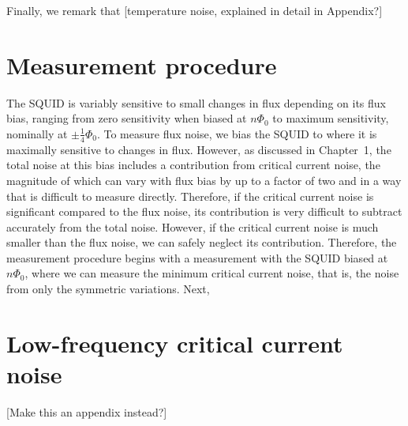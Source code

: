 Finally, we remark that [temperature noise, explained in detail in Appendix?]

\section{Measurement procedure}\label{chap:exp:sec:meas_proc}

The SQUID is variably sensitive to small changes in flux depending on its flux bias, ranging from zero sensitivity when biased at $n\Phi_0$ to maximum sensitivity, nominally at $\pm\tfrac{1}{4}\Phi_0$. To measure flux noise, we bias the SQUID to where it is maximally sensitive to changes in flux. However, as discussed in Chapter~1, the total noise at this bias includes a contribution from critical current noise, the magnitude of which can vary with flux bias by up to a factor of two and in a way that is difficult to measure directly. Therefore, if the critical current noise is significant compared to the flux noise, its contribution is very difficult to subtract accurately from the total noise. However, if the critical current noise is much smaller than the flux noise, we can safely neglect its contribution. Therefore, the measurement procedure begins with a measurement with the SQUID biased at $n\Phi_0$, where we can measure the minimum critical current noise, that is, the noise from only the symmetric variations. Next, 



\section{Low-frequency critical current noise}

[Make this an appendix instead?]








